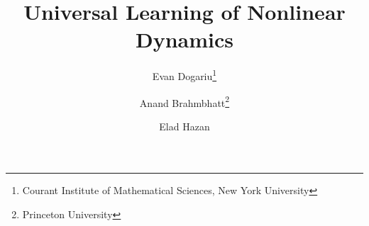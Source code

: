 \documentclass[11pt]{article}
\newif\ifanonymous
\newcommand{\ignore}[1]{}
\numberwithin{equation}{section}
\begin{document}
\title{Universal Learning of Nonlinear Dynamics}


\author{
  Evan Dogariu\thanks{Courant Institute of Mathematical Sciences, New York University} \and
  Anand Brahmbhatt\thanks{Princeton University } \and
  Elad Hazan\footnotemark[2]
}
\maketitle


\begin{abstract}\label{sec:0-abstract}

\ignore{
We introduce a new approach to learning dynamical systems based on \emph{improper learning} and spectral filtering. 
Instead of identifying the true dynamics, our method competes with a tractable comparator class: the best high-dimensional linear observer for the observed data. 
This shift avoids the nonconvexity and ill-conditioning of system identification while preserving finite-time performance guarantees, even for marginally stable, noisy, and nonlinear systems.

Our main algorithm, \emph{Online Spectral Filtering} (OSF), is an efficient online convex optimization method that provably learns any marginally stable, observable nonlinear dynamical system with regret bounded by $Q^\star \sqrt{T}$, where $Q^\star$ is a control-theoretic condition number defined through a Luenberger observer program. 
At its core is a new spectral filtering technique for linear dynamical systems that, for the first time, handles general asymmetric dynamics with adversarial process noise and without dependence on hidden state dimension. 
We also present a constructive discretization-based lifting from bounded Lipschitz nonlinear systems to high-dimensional linear systems, providing a principled way to extend OSF beyond the linear setting.

Experiments on synthetic systems, the Lorenz attractor, and Brax physics environments confirm the theoretical predictions, showing that OSF achieves high accuracy, robustness to noise, and the expected scaling with $Q^\star$, and outperforms strong baselines including eDMD and direct observer learning. 
This work bridges tools from control theory and online learning, illustrating how spectral filtering over a well-chosen comparator class can yield algorithms that are both provable and practical for complex dynamical systems.
}



\end{abstract}
\end{document}

